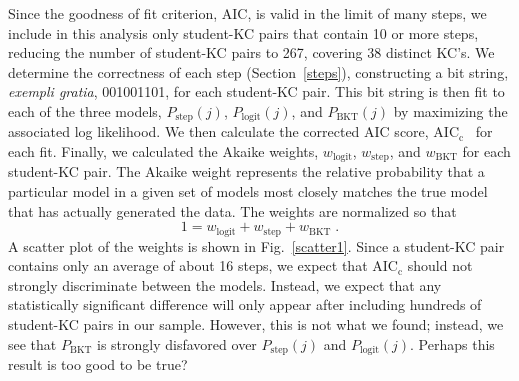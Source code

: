 \documentclass{acmlarge-edm}
\begin{document}
Since the goodness of fit criterion, AIC, is valid in the limit 
of many steps, we include in this analysis only student-KC 
pairs that contain 10 or more steps, reducing the number of 
student-KC pairs to 267, covering 38 distinct KC's.
We determine the correctness of each step (Section~\ref{steps}),
constructing a bit string, {\em exempli gratia},
001001101, for each student-KC pair.  
This bit string is then fit to each of the three models,
$P_\mathrm{step}(j)$, $P_\mathrm{logit}(j)$, and $P_\mathrm{BKT}(j)$ by
maximizing the associated log likelihood.  
We then calculate the corrected AIC score, AIC$_\mathrm{c}$~\cite{burnham_model_2002} 
for each fit.  
Finally, we calculated the Akaike weights, $w_\mathrm{logit}$,
$w_\mathrm{step}$, and $w_\mathrm{BKT}$ for each student-KC pair.  
The Akaike weight represents the relative probability that
a particular model in a given set of models most closely matches
the true model that has actually generated the data.
The weights are normalized so that 
%
\begin{equation}
   1=w_\mathrm{logit}+ w_\mathrm{step} + w_\mathrm{BKT} \; .
\end{equation}
%
A scatter plot of the weights is shown in Fig.~\ref{scatter1}.
Since a student-KC pair contains only an average of about 16 steps, we 
expect that AIC$_\mathrm{c}$ should not strongly
discriminate between the models.  Instead, we expect that
any statistically significant difference will only appear 
after including hundreds of student-KC pairs in our sample.  However, 
this is not what we found; instead, we see that $P_\mathrm{BKT}$ is 
strongly disfavored over $P_\mathrm{step}(j)$ and $P_\mathrm{logit}(j)$.
Perhaps this result is too good to be true?
\end{document}
